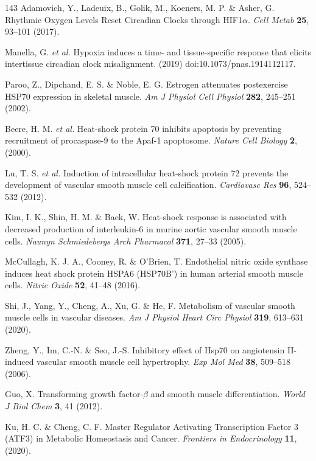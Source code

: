 \documentclass[12pt]{article}
\begin{document}
\begin{thebibliography}{143}
 Adamovich, Y., Ladeuix, B., Golik, M., Koeners, M. P. \& Asher, G. Rhythmic Oxygen Levels Reset Circadian Clocks through HIF1$\alpha$. \textit{Cell Metab} \textbf{25}, 93--101 (2017).

 Manella, G. \textit{et al.} Hypoxia induces a time- and tissue-specific response that elicits intertissue circadian clock misalignment. (2019) doi:10.1073/pnas.1914112117.

 Paroo, Z., Dipchand, E. S. \& Noble, E. G. Estrogen attenuates postexercise HSP70 expression in skeletal muscle. \textit{Am J Physiol Cell Physiol} \textbf{282}, 245--251 (2002).

 Beere, H. M. \textit{et al.} Heat-shock protein 70 inhibits apoptosis by preventing recruitment of procaspase-9 to the Apaf-1 apoptosome. \textit{Nature Cell Biology} \textbf{2}, (2000).

 Lu, T. S. \textit{et al.} Induction of intracellular heat-shock protein 72 prevents the development of vascular smooth muscle cell calcification. \textit{Cardiovasc Res} \textbf{96}, 524--532 (2012).

 Kim, I. K., Shin, H. M. \& Baek, W. Heat-shock response is associated with decreased production of interleukin-6 in murine aortic vascular smooth muscle cells. \textit{Naunyn Schmiedebergs Arch Pharmacol} \textbf{371}, 27--33 (2005).

 McCullagh, K. J. A., Cooney, R. \& O'Brien, T. Endothelial nitric oxide synthase induces heat shock protein HSPA6 (HSP70B') in human arterial smooth muscle cells. \textit{Nitric Oxide} \textbf{52}, 41--48 (2016).

 Shi, J., Yang, Y., Cheng, A., Xu, G. \& He, F. Metabolism of vascular smooth muscle cells in vascular diseases. \textit{Am J Physiol Heart Circ Physiol} \textbf{319}, 613--631 (2020).

 Zheng, Y., Im, C.-N. \& Seo, J.-S. Inhibitory effect of Hsp70 on angiotensin II-induced vascular smooth muscle cell hypertrophy. \textit{Exp Mol Med} \textbf{38}, 509--518 (2006).

 Guo, X. Transforming growth factor-$\beta$ and smooth muscle differentiation. \textit{World J Biol Chem} \textbf{3}, 41 (2012).

 Ku, H. C. \& Cheng, C. F. Master Regulator Activating Transcription Factor 3 (ATF3) in Metabolic Homeostasis and Cancer. \textit{Frontiers in Endocrinology} \textbf{11}, (2020).


\end{thebibliography}
\end{document}
